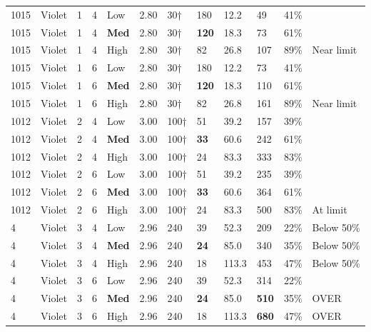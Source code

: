 \documentclass[12pt,letterpaper]{article}
\begin{document}
\begin{longtable}{C{0.6cm} L{1.0cm} C{0.5cm} C{0.5cm} C{1.0cm} C{0.8cm} C{0.9cm}
                  C{1.1cm} C{1.1cm} C{0.9cm} C{0.9cm} C{0.9cm}}
1015 & Violet & 1 & 4 & Low  & 2.80 & 30† & 180 & 12.2 & 49  & 41\% & \\
1015 & Violet & 1 & 4 & \textbf{Med}  & 2.80 & 30† & \textbf{120} & 18.3 & 73  & 61\% & \\
1015 & Violet & 1 & 4 & High & 2.80 & 30† & 82  & 26.8 & 107 & 89\% & Near limit \\
1015 & Violet & 1 & 6 & Low  & 2.80 & 30† & 180 & 12.2 & 73  & 41\% & \\
1015 & Violet & 1 & 6 & \textbf{Med}  & 2.80 & 30† & \textbf{120} & 18.3 & 110 & 61\% & \\
1015 & Violet & 1 & 6 & High & 2.80 & 30† & 82  & 26.8 & 161 & 89\% & Near limit \\
1012 & Violet & 2 & 4 & Low  & 3.00 & 100† & 51 & 39.2 & 157 & 39\% & \\
1012 & Violet & 2 & 4 & \textbf{Med}  & 3.00 & 100† & \textbf{33} & 60.6 & 242 & 61\% & \\
1012 & Violet & 2 & 4 & High & 3.00 & 100† & 24  & 83.3 & 333 & 83\% & \\
1012 & Violet & 2 & 6 & Low  & 3.00 & 100† & 51  & 39.2 & 235 & 39\% & \\
1012 & Violet & 2 & 6 & \textbf{Med}  & 3.00 & 100† & \textbf{33} & 60.6 & 364 & 61\% & \\
1012 & Violet & 2 & 6 & High & 3.00 & 100† & 24  & 83.3 & 500 & 83\% & At limit \\
4    & Violet & 3 & 4 & Low  & 2.96 & 240 & 39  & 52.3 & 209 & 22\% & Below 50\% \\
4    & Violet & 3 & 4 & \textbf{Med}  & 2.96 & 240 & \textbf{24} & 85.0 & 340 & 35\% & Below 50\% \\
4    & Violet & 3 & 4 & High & 2.96 & 240 & 18  & 113.3 & 453 & 47\% & Below 50\% \\
4    & Violet & 3 & 6 & Low  & 2.96 & 240 & 39  & 52.3 & 314 & 22\% & \\
4    & Violet & 3 & 6 & \textbf{Med}  & 2.96 & 240 & \textbf{24} & 85.0 & \textcolor{warnred}{\textbf{510}} & 35\% & \textcolor{warnred}{OVER} \\
4    & Violet & 3 & 6 & High & 2.96 & 240 & 18  & 113.3 & \textcolor{warnred}{\textbf{680}} & 47\% & \textcolor{warnred}{OVER} \\

\end{longtable}
\end{document}
